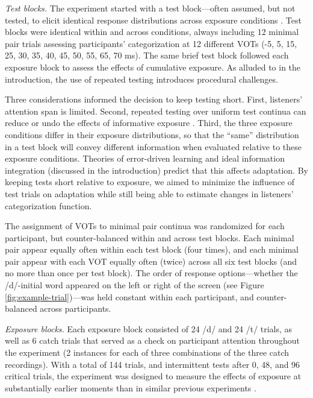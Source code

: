 \documentclass[
  11pt,
  man,mask,floatsintext]{apa6}
\begin{document}
\emph{Test blocks. } The experiment started with a test block---often assumed, but not tested, to elicit identical response distributions across exposure conditions \autocites[see also][]{colby2018,xie2021cognition}. Test blocks were identical within and across conditions, always including 12 minimal pair trials assessing participants' categorization at 12 different VOTs (-5, 5, 15, 25, 30, 35, 40, 45, 50, 55, 65, 70 ms). The same brief test block followed each exposure block to assess the effects of cumulative exposure. As alluded to in the introduction, the use of repeated testing introduces procedural challenges.

Three considerations informed the decision to keep testing short. First, listeners' attention span is limited. Second, repeated testing over uniform test continua can reduce or undo the effects of informative exposure \autocite{cummings-theodore2023,zheng-samuel2023,liu-jaeger2018,liu-jaeger2019,giovannone-theodore2021,tzeng2021}. Third, the three exposure conditions differ in their exposure distributions, so that the ``same'' distribution in a test block will convey different information when evaluated relative to these exposure conditions. Theories of error-driven learning and ideal information integration (discussed in the introduction) predict that this affects adaptation. By keeping tests short relative to exposure, we aimed to minimize the influence of test trials on adaptation while still being able to estimate changes in listeners' categorization function.

The assignment of VOTs to minimal pair continua was randomized for each participant, but counter-balanced within and across test blocks. Each minimal pair appear equally often within each test block (four times), and each minimal pair appear with each VOT equally often (twice) across all six test blocks (and no more than once per test block). The order of response options---whether the /d/-initial word appeared on the left or right of the screen (see Figure \ref{fig:example-trial})---was held constant within each participant, and counter-balanced across participants.

\emph{Exposure blocks. } Each exposure block consisted of 24 /d/ and 24 /t/ trials, as well as 6 catch trials that served as a check on participant attention throughout the experiment (2 instances for each of three combinations of the three catch recordings). With a total of 144 trials, and intermittent tests after 0, 48, and 96 critical trials, the experiment was designed to measure the effects of exposure at substantially earlier moments than in similar previous experiments \autocites[cf.~\textgreater200 critical trials in][]{clayards2008,kleinschmidt2020,theodore-monto2019,nixon2016}.
\end{document}
